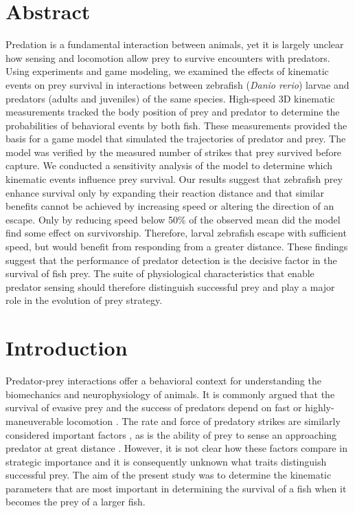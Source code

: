 \documentclass[]{rsos}%
\begin{document}
\section*{Abstract}
Predation is a fundamental interaction between animals, yet it is largely unclear how sensing and locomotion allow prey to survive encounters with predators.
Using experiments and game modeling, we examined the effects of kinematic events on prey survival in interactions between zebrafish (\textit{Danio rerio}) larvae and predators  (adults and juveniles) of the same species.
High-speed 3D kinematic measurements tracked the body position of prey and predator to determine the probabilities of behavioral events by both fish.
These measurements provided the basis for a game model that simulated the trajectories of predator and prey. 
The model was verified by the measured number of strikes that prey survived before capture.
We conducted a sensitivity analysis of the model to determine which kinematic events influence prey survival.
Our results suggest that zebrafish prey enhance survival only by expanding their reaction distance and that similar benefits cannot be achieved by increasing speed or altering the direction of an escape.
Only by reducing speed below 50\% of the observed mean did the model find some effect on survivorship.
Therefore, larval zebrafish escape with sufficient speed, but would benefit from responding from a greater distance.
These findings suggest that the performance of predator detection is the decisive factor in the survival of fish prey.
The suite of physiological characteristics that enable predator sensing should therefore distinguish successful prey and play a major role in the evolution of prey strategy.

\section{Introduction}

Predator-prey interactions offer a behavioral context for understanding the biomechanics and neurophysiology of animals.
It is commonly argued that the survival of evasive prey and the success of predators depend on fast or highly-maneuverable locomotion \cite{Alexander:BbR35qCj, Wilson:2013fda, Walker:2005vn, Domenici:2011tv, Howland:1974ud}.
The rate and force of predatory strikes are similarly considered important factors \cite{deVries:2012tc, Holzman:2009uu}, as is the ability of prey to sense an approaching predator at great distance \cite{Dill:1972wh, Gabbiani:1999wz}.
However, it is not clear how these factors compare in strategic importance and it is consequently unknown what traits distinguish successful prey. 
The aim of the present study was to determine the kinematic parameters that are most important in determining the survival of a fish when it becomes the prey of a larger fish.
\end{document}
